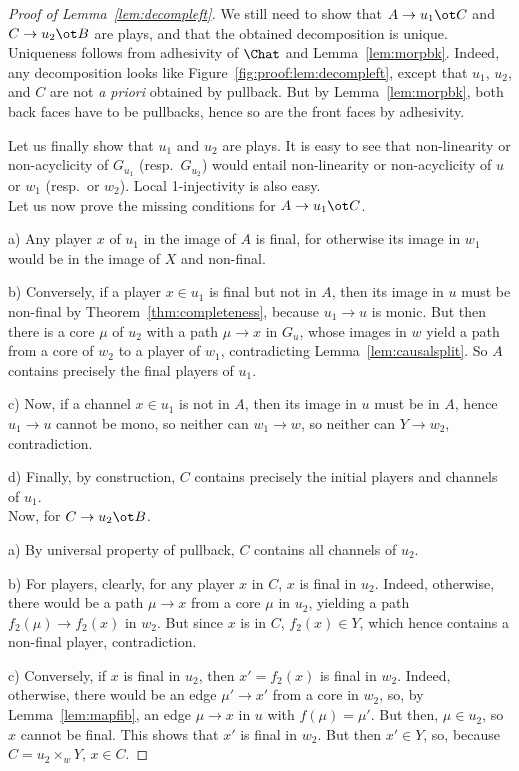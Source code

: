 \documentclass{LMCS}
\theoremstyle{plain}\newtheorem{satz}[thm]{Satz}
\begin{document}
\begin{proof}[Proof of Lemma~\ref{lem:decompleft}]
We still need to show that $A \to u_1 \ot C$ and $C \to u_2 \ot B$ are
plays, and that the obtained decomposition is unique.  Uniqueness
follows from adhesivity of $\Chat$ and Lemma~\ref{lem:morpbk}. Indeed,
any decomposition looks like Figure~\ref{fig:proof:lem:decompleft},
except that $u_1$, $u_2$, and $C$ are not \emph{a priori} obtained by
pullback. But by Lemma~\ref{lem:morpbk}, both back faces have to be
pullbacks, hence so are the front faces by adhesivity.

Let us finally show that $u_1$ and $u_2$ are plays. It is easy to see
that non-linearity or non-acyclicity of $G_{u_1}$ (resp.\ $G_{u_2}$)
would entail non-linearity or non-acyclicity of $u$ or $w_1$ (resp.\
or $w_2$). Local 1-injectivity
is also easy. \\

Let us now prove the missing conditions for $A \to u_1 \ot C$.

a) Any player $x$ of $u_1$ in the image of $A$ is final, for
otherwise its image in $w_1$ would be in the image of $X$ and
non-final. 

b) Conversely, if a player $x \in u_1$ is final but not in $A$, then
its image in $u$ must be non-final by Theorem~\ref{thm:completeness},
because $u_1 \to u$ is monic. But then there is a core $\mu$ of $u_2$
with a path $\mu \to x$ in $G_u$, whose images in $w$ yield a path
from a core of $w_2$ to a player of $w_1$, contradicting
Lemma~\ref{lem:causalsplit}. So $A$ contains precisely the final
players of $u_1$. 

c) Now, if a channel $x \in u_1$ is not in $A$, then its image in $u$
must be in $A$, hence $u_1 \to u$ cannot be mono, so neither can $w_1
\to w$, so neither can $Y \to w_2$, contradiction.

d) Finally, by construction, $C$ contains precisely the initial
players
and channels of $u_1$.\\

Now, for $C \to u_2 \ot B$.

a) By universal property of pullback, $C$ contains all channels of
$u_2$. 

b) For players, clearly, for any player $x$ in $C$, $x$ is final in
$u_2$. Indeed, otherwise, there would be a path $\mu \to x$ from a
core $\mu$ in $u_2$, yielding a path $f_2 (\mu) \to f_2 (x)$ in
$w_2$. But since $x$ is in $C$, $f_2 (x) \in Y$, which hence contains
a non-final player, contradiction.

c) Conversely, if $x$ is final in $u_2$, then $x' = f_2 (x)$ is final
in $w_2$. Indeed, otherwise, there would be an edge $\mu' \to x'$ from
a core in $w_2$, so, by Lemma~\ref{lem:mapfib}, an edge $\mu \to x$ in
$u$ with $f (\mu) = \mu'$. But then, $\mu \in u_2$, so $x$ cannot be
final. This shows that $x'$ is final in $w_2$. But then $x' \in Y$,
so, because $C = u_2 \times_{w} Y$, $x \in C$.


\end{proof}
\end{document}

